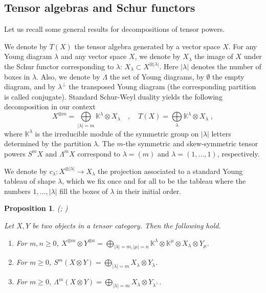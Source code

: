 \documentclass[12pt]{article}
\def\KK {{\mathbb K}}     %
\newtheorem{prop}[theorem]{Proposition}
\begin{document}
\subsection{Tensor algebras and Schur functors}\label{Sec Schur}

Let us recall some general results for decompositions of tensor powers.

We denote by $T(X)$ the tensor algebra generated by a vector space $X$. For any Young diagram $\lambda$ and any vector space $X$, we denote by  $X_\lambda$ the image of $X$ under the Schur functor corresponding to $\lambda$: $X_\lambda\subset X^{\otimes|\lambda|}$. Here $|\lambda|$ denotes the number of boxes in $\lambda$. Also, we denote by $\Lambda$ the set of Young diagrams, by $\emptyset$ the empty diagram, and by $\lambda^\perp$ the transposed Young diagram (the corresponding partition is called conjugate). Standard Schur-Weyl duality yields the following decomposition in our context
$$
X^{\otimes m}=\bigoplus\limits_{|\lambda|=m} \KK^\lambda \otimes X_\lambda \quad,\quad T(X) = \bigoplus\limits_{\lambda} \KK^\lambda \otimes X_\lambda \;,
$$
where $\KK^\lambda$ is the irreducible module of the symmetric group on $|\lambda|$ letters determined by the partition $\lambda$. The $m$-the symmetric and skew-symmetric tensor powers $S^mX$ and $\Lambda^mX$ correspond to $\lambda=(m)$ and $\lambda=(1,...,1)$, respectively.

We denote by $c_\lambda:X^{\otimes|\lambda|}\to X_\lambda$ the projection associated to a standard Young tableau of shape $\lambda$, which we fix once and for all to be the tableau where the numbers $1,...,|\lambda|$ fill the boxes of $\lambda$ in their initial order.

\begin{prop} (\cite[Proposition~2.2]{Chirvasitu-Penkov-UTC}; \cite[\S~4]{Penkov-Serganova-Mackey})

Let $X,Y$ be two objects in a tensor category. Then the following hold.
\begin{enumerate}
\item For $m,n\geq 0$, $X^{\otimes m}\otimes Y^{\otimes n} = \bigoplus\limits_{|\lambda|=m,|\mu|=n} \KK^\lambda\otimes\KK^\mu \otimes X_\lambda\otimes Y_\mu$.
\item For $m\geq 0$, $S^m(X\otimes Y)= \bigoplus\limits_{|\lambda|=m} X_\lambda\otimes Y_\lambda$.
\item For $m\geq 0$, $\Lambda^m(X\otimes Y)= \bigoplus\limits_{|\lambda|=m} X_\lambda\otimes Y_{\lambda^\perp}$.
\end{enumerate}
\end{prop}
\end{document}
